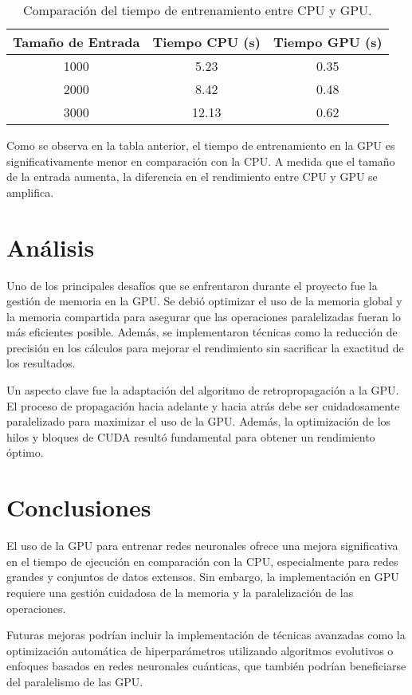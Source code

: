 \documentclass[12pt]{article}
\begin{document}
\begin{table}[h!]
\centering
\begin{tabular}{|c|c|c|}
\hline
Tamaño de Entrada & Tiempo CPU (s) & Tiempo GPU (s) \\
\hline
1000 & 5.23 & 0.35 \\
2000 & 8.42 & 0.48 \\
3000 & 12.13 & 0.62 \\
\hline
\end{tabular}
\caption{Comparación del tiempo de entrenamiento entre CPU y GPU.}
\end{table}

Como se observa en la tabla anterior, el tiempo de entrenamiento en la GPU es significativamente menor en comparación con la CPU. A medida que el tamaño de la entrada aumenta, la diferencia en el rendimiento entre CPU y GPU se amplifica.

\section{Análisis}
Uno de los principales desafíos que se enfrentaron durante el proyecto fue la gestión de memoria en la GPU. Se debió optimizar el uso de la memoria global y la memoria compartida para asegurar que las operaciones paralelizadas fueran lo más eficientes posible. Además, se implementaron técnicas como la reducción de precisión en los cálculos para mejorar el rendimiento sin sacrificar la exactitud de los resultados.

Un aspecto clave fue la adaptación del algoritmo de retropropagación a la GPU. El proceso de propagación hacia adelante y hacia atrás debe ser cuidadosamente paralelizado para maximizar el uso de la GPU. Además, la optimización de los hilos y bloques de CUDA resultó fundamental para obtener un rendimiento óptimo.

\section{Conclusiones}
El uso de la GPU para entrenar redes neuronales ofrece una mejora significativa en el tiempo de ejecución en comparación con la CPU, especialmente para redes grandes y conjuntos de datos extensos. Sin embargo, la implementación en GPU requiere una gestión cuidadosa de la memoria y la paralelización de las operaciones.

Futuras mejoras podrían incluir la implementación de técnicas avanzadas como la optimización automática de hiperparámetros utilizando algoritmos evolutivos o enfoques basados en redes neuronales cuánticas, que también podrían beneficiarse del paralelismo de las GPU.
\end{document}
